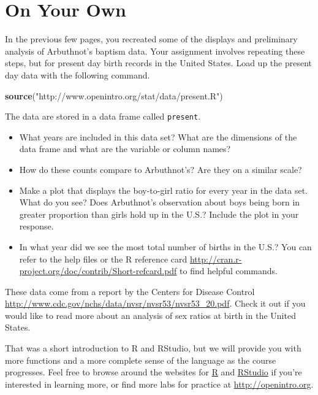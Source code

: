 \documentclass[]{book}
\newenvironment{Shaded}{\begin{snugshade}}{\end{snugshade}}
\newcommand{\KeywordTok}[1]{\textcolor[rgb]{0.13,0.29,0.53}{\textbf{{#1}}}}
\newcommand{\StringTok}[1]{\textcolor[rgb]{0.31,0.60,0.02}{{#1}}}
\newcommand{\NormalTok}[1]{{#1}}
\theoremstyle{definition}
\theoremstyle{definition}
\theoremstyle{definition}
\theoremstyle{remark}
\begin{document}
\section{On Your Own}\label{on-your-own}

In the previous few pages, you recreated some of the displays and
preliminary analysis of Arbuthnot's baptism data. Your assignment
involves repeating these steps, but for present day birth records in the
United States. Load up the present day data with the following command.

\begin{Shaded}
\begin{Highlighting}[]
\KeywordTok{source}\NormalTok{(}\StringTok{"http://www.openintro.org/stat/data/present.R"}\NormalTok{)}
\end{Highlighting}
\end{Shaded}

The data are stored in a data frame called \texttt{present}.

\begin{itemize}
\item
  What years are included in this data set? What are the dimensions of
  the data frame and what are the variable or column names?
\item
  How do these counts compare to Arbuthnot's? Are they on a similar
  scale?
\item
  Make a plot that displays the boy-to-girl ratio for every year in the
  data set. What do you see? Does Arbuthnot's observation about boys
  being born in greater proportion than girls hold up in the U.S.?
  Include the plot in your response.
\item
  In what year did we see the most total number of births in the U.S.?
  You can refer to the help files or the R reference card
  \url{http://cran.r-project.org/doc/contrib/Short-refcard.pdf} to find
  helpful commands.
\end{itemize}

These data come from a report by the Centers for Disease Control
\url{http://www.cdc.gov/nchs/data/nvsr/nvsr53/nvsr53_20.pdf}. Check it
out if you would like to read more about an analysis of sex ratios at
birth in the United States.

That was a short introduction to R and RStudio, but we will provide you
with more functions and a more complete sense of the language as the
course progresses. Feel free to browse around the websites for
\href{http://www.r-project.org}{R} and
\href{http://rstudio.org}{RStudio} if you're interested in learning
more, or find more labs for practice at \url{http://openintro.org}.
\end{document}
